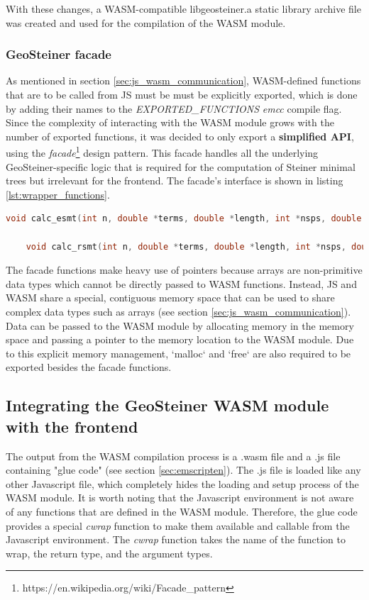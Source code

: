 \documentclass{l4proj}
\begin{document}
With these changes, a WASM-compatible libgeosteiner.a static library archive file was created and used for the compilation of the WASM module.

\subsubsection{GeoSteiner facade}
As mentioned in section \ref{sec:js_wasm_communication}, WASM-defined functions that are to be called from JS must be must be explicitly exported, which is done by adding their names to the \textit{EXPORTED\_FUNCTIONS} \textit{emcc} compile flag.
Since the complexity of interacting with the WASM module grows with the number of exported functions, it was decided to only export a \textbf{simplified API}, using the \textit{facade}\footnote{https://en.wikipedia.org/wiki/Facade\_pattern} design pattern. This facade handles all the underlying GeoSteiner-specific logic that is required for the computation of Steiner minimal trees but irrelevant for the frontend. The facade's interface is shown in listing \ref{lst:wrapper_functions}.

\begin{lstlisting}[language=C,caption=Wrapper functions for the Geosteiner library,label=lst:wrapper_functions]
    void calc_esmt(int n, double *terms, double *length, int *nsps, double *sps, int *nedges, int *edges);

    void calc_rsmt(int n, double *terms, double *length, int *nsps, double *sps, int *nedges, int *edges);
\end{lstlisting}

The facade functions make heavy use of pointers because arrays are non-primitive data types which cannot be directly passed to WASM functions. Instead, JS and WASM share a special, contiguous memory space that can be used to share complex data types such as arrays (see section \ref{sec:js_wasm_communication}). Data can be passed to the WASM module by allocating memory in the memory space and passing a pointer to the memory location to the WASM module. Due to this explicit memory management, `malloc` and `free` are also required to be exported besides the facade functions.

\subsection{Integrating the GeoSteiner WASM module with the frontend}
The output from the WASM compilation process is a .wasm file and a .js file containing "glue code" (see section \ref{sec:emscripten}). The .js file is loaded like any other Javascript file, which completely hides the loading and setup process of the WASM module.
It is worth noting that the Javascript environment is not aware of any functions that are defined in the WASM module. Therefore, the glue code provides a special \textit{cwrap} function to make them available and callable from the Javascript environment. The \textit{cwrap} function takes the name of the function to wrap, the return type, and the argument types.
\end{document}
